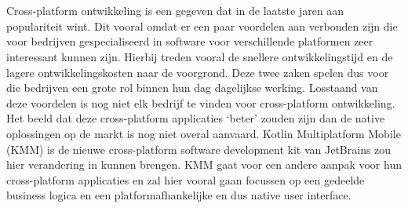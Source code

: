 
\chapter{}
\label{ch:inleiding}

Cross-platform ontwikkeling is een gegeven dat in de laatste jaren aan populariteit wint. Dit vooral omdat er een paar voordelen aan verbonden zijn die voor bedrijven gespecialiseerd in software voor verschillende platformen zeer interessant kunnen zijn. Hierbij treden vooral de snellere ontwikkelingstijd en de lagere ontwikkelingskosten naar de voorgrond. Deze twee zaken spelen dus voor die bedrijven een grote rol binnen hun dag dagelijkse werking. Losstaand van deze voordelen is nog niet elk bedrijf te vinden voor cross-platform ontwikkeling. Het beeld dat deze cross-platform applicaties `beter' zouden zijn dan de native oplossingen op de markt is nog niet overal aanvaard. Kotlin Multiplatform Mobile (KMM) is de nieuwe cross-platform software development kit van JetBrains zou hier verandering in kunnen brengen. KMM gaat voor een andere aanpak voor hun cross-platform applicaties en zal hier vooral gaan focussen op een gedeelde business logica en een platformafhankelijke en dus native user interface. 



